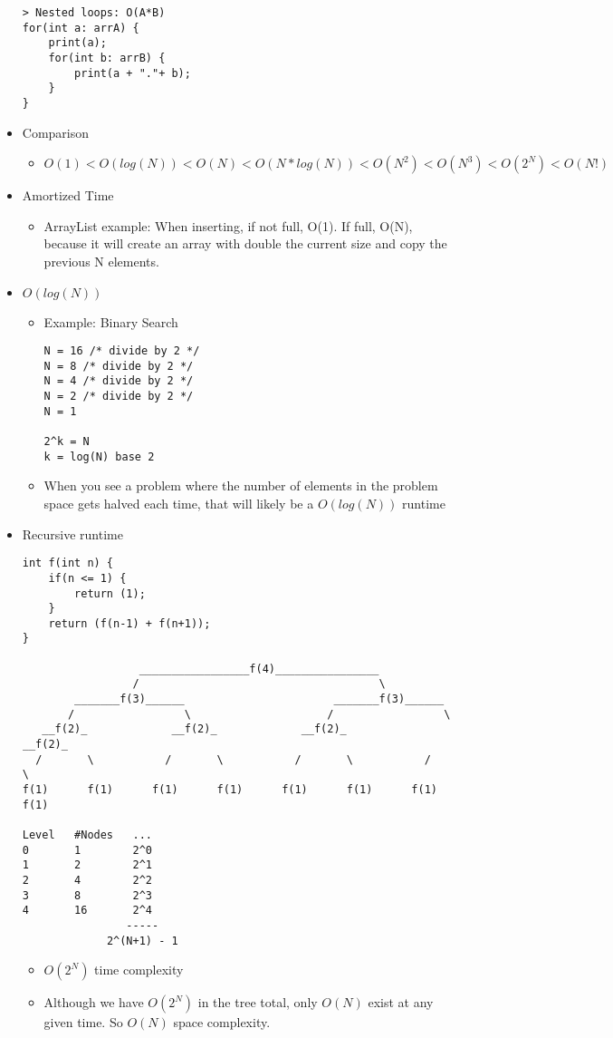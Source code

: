 \documentclass[a4paper, 11.25pt]{article}
\begin{document}
\begin{itemize}
\begin{lstlisting}[style=CStyle]
> Nested loops: O(A*B)
for(int a: arrA) {
    print(a);
    for(int b: arrB) {
        print(a + "."+ b);
    }
}\end{lstlisting}
    \item Comparison
    \begin{itemize}
        \item $O(1) < O(log(N)) < O(N) < O(N*log(N)) < O(N^{2}) < O(N^{3}) < O(2^{N}) < O(N!)$
    \end{itemize}
    \item Amortized Time
    \begin{itemize}
        \item ArrayList example: When inserting, if not full, O(1). If full, O(N), because it will create an array with double the current size and copy the previous N elements.
    \end{itemize}
    \item $O(log(N))$
    \begin{itemize}
        \item Example: Binary Search
        \begin{lstlisting}[style=CStyle]
N = 16 /* divide by 2 */
N = 8 /* divide by 2 */
N = 4 /* divide by 2 */
N = 2 /* divide by 2 */
N = 1 

2^k = N
k = log(N) base 2\end{lstlisting}
        \item When you see a problem where the number of elements in the problem space gets halved each time, that will likely be a $O(log(N))$ runtime
    \end{itemize}
    \item Recursive runtime
    \begin{lstlisting}[style=CStyle]
int f(int n) {
    if(n <= 1) {
        return (1);
    }
    return (f(n-1) + f(n+1));
}
    
                  _________________f(4)________________
                 /                                     \
        _______f(3)______                       _______f(3)______
       /                 \                     /                 \
   __f(2)_             __f(2)_             __f(2)_             __f(2)_
  /       \           /       \           /       \           /       \
f(1)      f(1)      f(1)      f(1)      f(1)      f(1)      f(1)      f(1)
    
Level   #Nodes   ...
0       1        2^0
1       2        2^1
2       4        2^2
3       8        2^3
4       16       2^4
                -----
             2^(N+1) - 1\end{lstlisting}
    \begin{itemize}
        \item $O(2^{N})$ time complexity
        \item Although we have $O(2^{N})$ in the tree total, only $O(N)$ exist at any given time. So $O(N)$ space complexity.
    \end{itemize}
\end{itemize}
\end{document}
